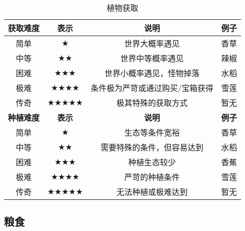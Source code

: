 \begin{table}[H]
    \centering
    \caption{植物获取}
    \label{table:植物获取}
    \setlength{\tabcolsep}{4mm}
    \begin{tabular}{c|ccc}
        \toprule
        \textbf{获取难度} & \textbf{表示}                                  & \textbf{说明}                   & \textbf{例子} \\
        \midrule
        简单              & $\bigstar$                                     & 世界大概率遇见                  & 香草          \\
        中等              & $\bigstar\bigstar$                             & 世界中等概率遇见                & 辣椒          \\
        困难              & $\bigstar \bigstar \bigstar$                   & 世界小概率遇见，怪物掉落        & 水稻          \\
        极难              & $\bigstar \bigstar \bigstar \bigstar$          & 条件极为严苛或通过购买/宝箱获得 & 雪莲          \\
        传奇              & $\bigstar \bigstar \bigstar \bigstar \bigstar$ & 极其特殊的获取方式              & 暂无          \\
        \midrule
        \textbf{种植难度} & \textbf{表示}                                  & \textbf{说明}                   & \textbf{例子} \\
        \midrule
        简单              & $\bigstar$                                     & 生态等条件宽裕                  & 香草          \\
        中等              & $\bigstar\bigstar$                             & 需要特殊的条件，但容易达到      & 水稻          \\
        困难              & $\bigstar \bigstar \bigstar$                   & 种植生态较少                    & 香蕉          \\
        极难              & $\bigstar \bigstar \bigstar \bigstar$          & 严苛的种植条件                  & 雪莲          \\
        传奇              & $\bigstar \bigstar \bigstar \bigstar \bigstar$ & 无法种植或极难达到              & 暂无          \\
        \bottomrule
    \end{tabular}
\end{table}

\subsection{粮食}

